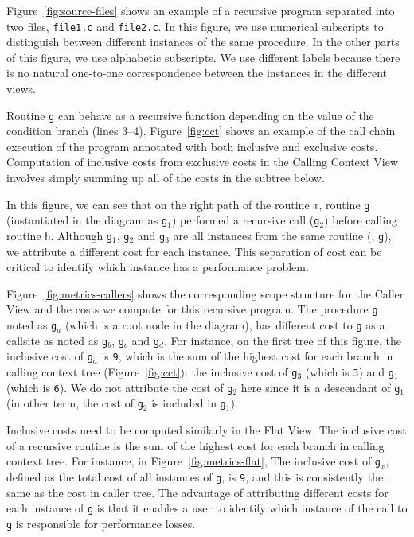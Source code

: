 Figure~\ref{fig:source-files} shows an example of a recursive program separated into two files, \texttt{file1.c} and \texttt{file2.c}.
In this figure, we use numerical subscripts to distinguish between different instances of the same procedure.
In the other parts of this figure, we use alphabetic subscripts.
We use different labels because there is no natural one-to-one correspondence between the instances in the different views.

Routine \texttt{g} can behave as a recursive function depending on the value of the condition branch (lines 3--4).
Figure~\ref{fig:cct} shows an example of the call chain execution of the program annotated with both inclusive and exclusive costs.
Computation of inclusive costs from exclusive costs in the Calling Context View involves simply summing up all of the costs in the subtree below.

In this figure, we can see that on the right path of the routine \texttt{m}, routine \texttt{g} (instantiated in the diagram as \texttt{g$_1$}) performed a recursive call (\texttt{g$_2$}) before calling routine \texttt{h}.
Although \texttt{g$_1$}, \texttt{g$_2$} and \texttt{g$_3$} are all instances from the same routine (\ie{}, \texttt{g}), we attribute a different cost for each instance.
This separation of cost can be critical to identify which instance has a performance problem.

Figure~\ref{fig:metrics-callers} shows the corresponding scope structure for the Caller View and the costs we compute for this recursive program.
The procedure \texttt{g} noted as \texttt{g$_a$} (which is a root node in the diagram), has different cost to \texttt{g} as a callsite as noted as \texttt{g$_b$}, \texttt{g$_c$} and \texttt{g$_d$}.
For instance, on the first tree of this figure, the inclusive cost of \texttt{g$_a$} is \texttt{9}, which is the sum of the highest cost for each branch in calling context tree (Figure~\ref{fig:cct}): the inclusive cost of \texttt{g$_3$} (which is \texttt{3}) and \texttt{g$_1$} (which is \texttt{6}).
We do not attribute the cost of \texttt{g$_2$} here since it is a descendant of \texttt{g$_1$} (in other term, the cost of \texttt{g$_2$} is included in \texttt{g$_1$}).

Inclusive costs need to be computed similarly in the Flat View.
The inclusive cost of a recursive routine is the sum of the highest cost for each branch in calling context tree.
For instance, in Figure~\ref{fig:metrics-flat}, The inclusive cost of \texttt{g$_x$}, defined as the total cost of all instances of \texttt{g}, is \texttt{9}, and this is consistently the same as the cost in caller tree.
The advantage of attributing different costs for each instance of \texttt{g} is that it enables a user to identify which instance of the call to \texttt{g} is responsible for performance losses.


